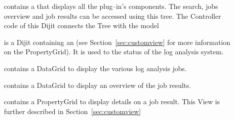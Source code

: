 \begin{description}
	\item[] contains a  that displays all the plug--in's components. The search, jobs overview and job results can be accessed using this tree.
	The Controller code of this Dijit connects the Tree with the  model
	\item[] is a Dijit containing an  (see Section~\ref{sec:customview} for more information on the PropertyGrid). It is used to the status of the log analysis system.
	\item[] contains a DataGrid to display the various log analysis jobs.
	\item[] contains a DataGrid to display an overview of the job results.
	\item[] contains a PropertyGrid to display details on a job result. This View is further described in Section~\ref{sec:customview}
\end{description}

